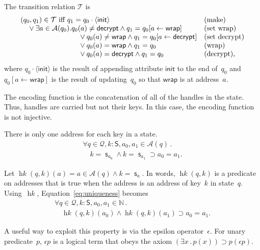 \documentclass[12pt]{article}
\newcommand{\cn}[1]{\ensuremath{\operatorname{\mathsf{#1}}}}
\newcommand{\fn}[1]{\ensuremath{\operatorname{\mathit{#1}}}}
\newcommand{\srt}[1]{\ensuremath{\mathsf{#1}}}
\newcommand{\typ}{\mathbin:}
\newcommand{\seq}[1]{\ensuremath{\langle#1\rangle}}
\newcommand{\append}{\cdot}
\newcommand{\nat}{\ensuremath{\mathbb{N}}}
\newcommand{\all}[1]{\forall#1\mathpunct.}
\newcommand{\some}[1]{\exists#1\mathpunct.}
\newcommand{\sta}{\ensuremath{\mathcal{Q}}}
\newcommand{\tran}{\ensuremath{\mathcal{T}}}
\newcommand{\addr}{\ensuremath{\mathcal{A}}}
\newcommand{\ainit}{\ensuremath{\mathsf{init}}}
\newcommand{\awrap}{\ensuremath{\mathsf{wrap}}}
\newcommand{\adecrypt}{\ensuremath{\mathsf{decrypt}}}
\begin{document}
The transition relation {\tran} is
\[\begin{array}{l@{}ll}
\multicolumn{2}{l}{(q_0,q_1)\in\tran
\mbox{ iff }q_1=q_0\append{\seq{\ainit}}}&\mbox{(make)}\\
\quad{}\lor\some{a\in\addr(q_0)}&q_0(a)\neq\adecrypt\land
q_1=q_0[a\leftarrow\awrap]&\mbox{(set wrap)}\\
&\quad{}\lor q_0(a)\neq\awrap\land
q_1=q_0[a\leftarrow\adecrypt]&\mbox{(set decrypt)}\\
&\quad{}\lor q_0(a)=\awrap\land
q_1=q_0&\mbox{(wrap)}\\
&\quad{}\lor q_0(a)=\adecrypt\land
q_1=q_0&\mbox{(decrypt)},
\end{array}\]
where $q_0\append{\seq{\ainit}}$ is the result of appending
attribute {\ainit} to the end of~$q_0$ and
$q_0[a\leftarrow\awrap]$ is the result of updating~$q_0$ so that
{\awrap} is at address~$a$.

The encoding function is the concatenation of all of the handles in
the state.  Thus, handles are carried but not their keys.  In this
case, the encoding function is not injective.

There is only one address for each key in a state.
\begin{equation}\label{eq:uniqueness}
  \begin{array}{l}
    \all{q\in\sta,k\typ\srt{S},a_0,a_1\in\addr(q)}\\
    \quad k=\cn{s}_{a_0}{}\land k=\cn{s}_{a_1}\supset a_0=a_1.
  \end{array}
\end{equation}

Let $\fn{hk}(q,k)(a)= a\in\addr(q)\land k=\cn{s}_a$.  In words,
$\fn{hk}(q,k)$ is a predicate on addresses that is true when the
address is an address of key~$k$ in state~$q$.  Using~\fn{hk},
Equation~\ref{eq:uniqueness} becomes
%
\begin{equation}\label{eq:uniqueness alt}
  \begin{array}{l}
    \all{q\in\sta,k\typ\srt{S},a_0,a_1\in\nat}\\
    \quad \fn{hk}(q,k)(a_0)\land\fn{hk}(q,k)(a_1)\supset a_0=a_1.
  \end{array}
\end{equation}

A useful way to exploit this property is via the epsilon
operator~$\epsilon$.  For unary predicate~$p$, $\epsilon p$ is a
logical term that obeys the axiom $(\some{x}p(x))\supset p(\epsilon p)$.

\end{document}
